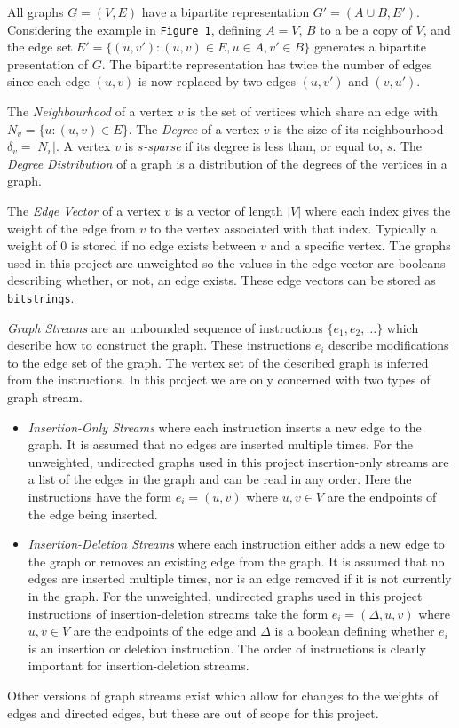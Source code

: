 \documentclass[11pt,twoside,a4paper]{report}
\begin{document}
\par All graphs $G=(V,E)$ have a bipartite representation $G'=(A\cup B,E')$. Considering the example in \texttt{Figure 1}, defining $A=V$, $B$ to a be a copy of $V$, and the edge set \newline${E'=\{(u,v'):(u,v)\in E,u\in A,v'\in B\}}$ generates a bipartite presentation of $G$. The bipartite representation has twice the number of edges since each edge $(u,v)$ is now replaced by two edges $(u,v')$ and $(v,u')$. %

\par The \textit{Neighbourhood} of a vertex $v$ is the set of vertices which share an edge with $N_v=\{u:(u,v)\in E\}$. The \textit{Degree} of a vertex $v$ is the size of its neighbourhood $\delta_v=|N_v|$. A vertex $v$ is \textit{$s$-sparse} if its degree is less than, or equal to, $s$. The \textit{Degree Distribution} of a graph is a distribution of the degrees of the vertices in a graph.
\par The \textit{Edge Vector} of a vertex $v$ is a vector of length $|V|$ where each index gives the weight of the edge from $v$ to the vertex associated with that index. Typically a weight of 0 is stored if no edge exists between $v$ and a specific vertex. The graphs used in this project are unweighted so the values in the edge vector are booleans describing whether, or not, an edge exists. These edge vectors can be stored as \texttt{bitstrings}.
\par \textit{Graph Streams} are an unbounded sequence of instructions $\{e_1,e_2,\dots\}$ which describe how to construct the graph. These instructions $e_i$ describe modifications to the edge set of the graph. The vertex set of the described graph is inferred from the instructions. In this project we are only concerned with two types of graph stream.
\begin{itemize}
	\item \textit{Insertion-Only Streams} where each instruction inserts a new edge to the graph. It is assumed that no edges are inserted multiple times. For the unweighted, undirected graphs used in this project insertion-only streams are a list of the edges in the graph and can be read in any order. Here the instructions have the form $e_i=(u,v)$ where $u,v\in V$ are the endpoints of the edge being inserted.
	\item \textit{Insertion-Deletion Streams} where each instruction either adds a new edge to the graph or removes an existing edge from the graph. It is assumed that no edges are inserted multiple times, nor is an edge removed if it is not currently in the graph. For the unweighted, undirected graphs used in this project instructions of insertion-deletion streams take the form $e_i=(\Delta,u,v)$ where $u,v\in V$ are the endpoints of the edge and $\Delta$ is a boolean defining whether $e_i$ is an insertion or deletion instruction. The order of instructions is clearly important for insertion-deletion streams.
\end{itemize}
Other versions of graph streams exist which allow for changes to the weights of edges and directed edges, but these are out of scope for this project.
\end{document}
